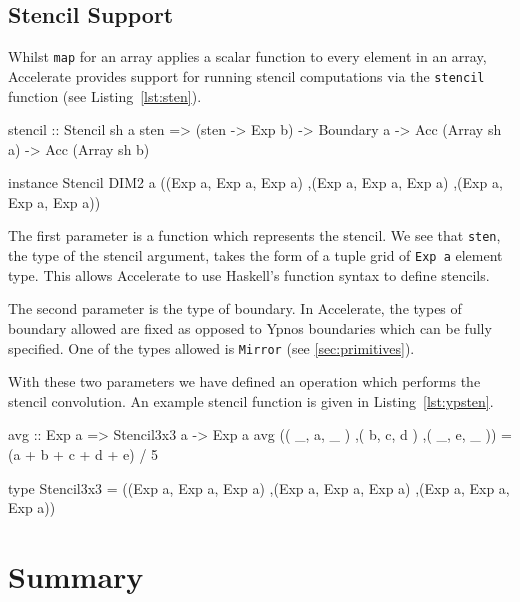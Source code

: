\documentclass[
    12pt,
    a4paper,
    twoside,
    openright,
    ]{scrbook}
\begin{document}
\subsection{Stencil Support}

Whilst \texttt{map} for an array applies a scalar function to every element in
an array, Accelerate provides support for running stencil computations via the
\texttt{stencil} function (see Listing~\ref{lst:sten}).

\begin{hflisting}[label={lst:sten}, caption={The type of the stencil application
  function in Accelerate. Including an example instance of the
  \texttt{Stencil} type class. Many others are also possible.}]
stencil :: Stencil sh a sten =>
           (sten -> Exp b) ->
           Boundary a ->
           Acc (Array sh a) ->
           Acc (Array sh b)

instance Stencil DIM2 a ((Exp a, Exp a, Exp a)
                        ,(Exp a, Exp a, Exp a)
                        ,(Exp a, Exp a, Exp a))
\end{hflisting}

The first parameter is a function which represents the stencil. We see that
\texttt{sten}, the type of the stencil argument, takes the form of a tuple grid
of \texttt{Exp a} element type. This allows Accelerate to use Haskell's function
syntax to define stencils.

The second parameter is the type of boundary. In Accelerate, the types of
boundary allowed are fixed as opposed to Ypnos boundaries which can be fully
specified. One of the types allowed is \texttt{Mirror} (see
\autoref{sec:primitives}).

With these two parameters we have defined an operation which performs the
stencil convolution. An example stencil function is given in
Listing~\ref{lst:ypsten}.

\begin{hlisting}[label={lst:ypsten}, caption={The ``average'' stencil defined
  using Accelerate's syntax.}]
avg :: Exp a => Stencil3x3 a -> Exp a
avg (( _, a, _ )
    ,( b, c, d )
    ,( _, e, _ )) = (a + b + c + d + e) / 5

type Stencil3x3 = ((Exp a, Exp a, Exp a)
                  ,(Exp a, Exp a, Exp a)
                  ,(Exp a, Exp a, Exp a))
\end{hlisting}

\section{Summary}
\end{document}
